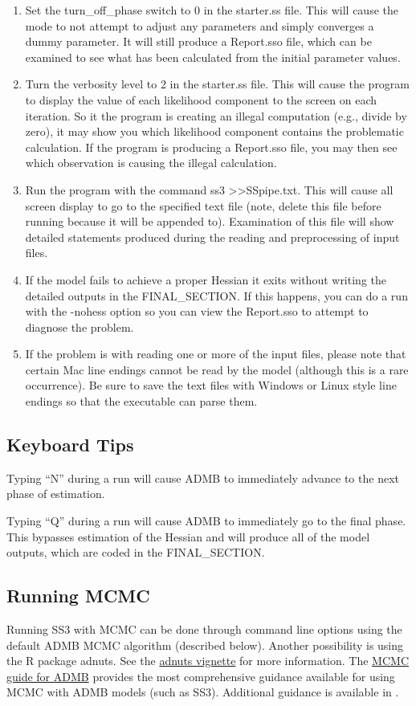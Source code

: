 \begin{enumerate}
	\item Set the turn\_off\_phase switch to 0 in the starter.ss file.  This will cause the mode to not attempt to adjust any parameters and simply converges a dummy parameter.  It will still produce a Report.sso file, which can be examined to see what has been calculated from the initial parameter values.
	\item Turn the verbosity level to 2 in the starter.ss file.  This will cause the program to display the value of each likelihood component to the screen on each iteration.  So it the program is creating an illegal computation (e.g., divide by zero), it may show you which likelihood component contains the problematic calculation.  If the program is producing a Report.sso file, you may then see which observation is causing the illegal calculation.
	\item Run the program with the command ss3 >>SSpipe.txt.  This will cause all screen display to go to the specified text file (note, delete this file before running because it will be appended to).  Examination of this file will show detailed statements produced during the reading and preprocessing of input files.
	\item If the model fails to achieve a proper Hessian it exits without writing the detailed outputs in the FINAL\_SECTION.  If this happens, you can do a run with the -nohess option so you can view the Report.sso to attempt to diagnose the problem.
	\item If the problem is with reading one or more of the input files, please note that certain Mac line endings cannot be read by the model (although this is a rare occurrence). Be sure to save the text files with Windows or Linux style line endings so that the executable can parse them.
\end{enumerate}

\subsection{Keyboard Tips}
Typing ``N'' during a run will cause ADMB to immediately advance to the next phase of estimation.

Typing ``Q''  during a run will cause ADMB to immediately go to the final phase.  This bypasses estimation of the Hessian and will produce all of the model outputs, which are coded in the FINAL\_SECTION.

\subsection{Running MCMC}
 Running SS3 with MCMC can be done through command line options using the default ADMB MCMC algorithm (described below). Another possibility is using the R package adnuts. See the \href{https://cran.r-project.org/web/packages/adnuts/vignettes/adnuts.html}{adnuts vignette} for more information. The \href{https://www.admb-project.org/developers/mcmc/mcmc-guide-for-admb.pdf}{MCMC guide for ADMB} provides the most comprehensive guidance available for using MCMC with ADMB models (such as SS3). Additional guidance is available in \citep{monnahan2019overcoming}.


